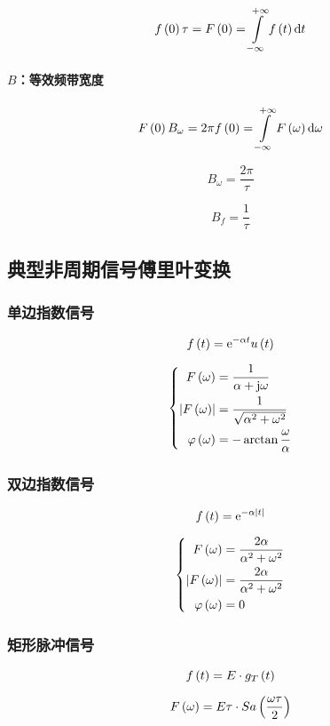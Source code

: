 \documentclass{article}
\begin{document}
\[f\pare{0}\tau=F\pare{0}=\impint\ft\d t\]

\paragraph{$B$：等效频带宽度}

\[F\pare{0}B_\omega=2\pi f\pare{0}=\impint F\pare{\omega}\d\omega\]

\[B_\omega=\frac{2\pi}\tau\]

\[B_f=\frac1\tau\]

\subsection{典型非周期信号傅里叶变换}

\subsubsection{单边指数信号}

\[f\left(t\right)=\mathrm e^{-\alpha t}u\left(t\right)\]

\[\left\{\begin{aligned}
        F\left(\omega\right)       & =\frac1{\alpha+\mathrm j\omega}          \\
        \left|F\left(\omega\right)\right| & =\frac1{\sqrt{\alpha^2+\omega^2}} \\
        \varphi\left(\omega\right) & =-\arctan\frac\omega\alpha
    \end{aligned}\right.\]

\subsubsection{双边指数信号}

\[f\left(t\right)=\mathrm e^{-\alpha\left|t\right|}\]

\[\left\{\begin{aligned}
        F\left(\omega\right)       & =\frac{2\alpha}{\alpha^2+\omega^2} \\
        \left|F\left(\omega\right)\right| & =\frac{2\alpha}{\alpha^2+\omega^2} \\
        \varphi\left(\omega\right) & =0
    \end{aligned}\right.\]

\subsubsection{矩形脉冲信号}

\[f\left(t\right)=E\cdot g_T\left(t\right)\]

\[F\left(\omega\right)=E\tau\cdot Sa\left(\frac{\omega\tau}2\right)\]
\end{document}
